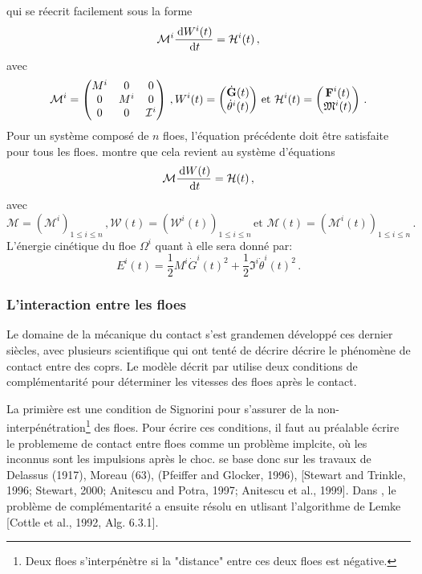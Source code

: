 qui se réecrit facilement sous la forme 
\begin{align}    
    \mathcal{M}^i \frac{\diff W^i(t)}{\diff t} = \mathcal{H}^i(t) \,,
\end{align}
avec 
$$
\mathcal{M}^i = 
\begin{pmatrix}
    M^i & 0 & 0 \\ 0 & M^i & 0 \\ 0 & 0 & \mathcal{I}^i
\end{pmatrix} \,,
W^i(t) = 
\begin{pmatrix}
    \dot{\bm{\mathrm{G}}}(t) \\ \dot{\theta}^i(t)
\end{pmatrix} \,
\text{et } \mathcal{H}^i(t) = 
\begin{pmatrix}
    \bm{\mathrm{F}}^i(t) \\ \mathfrak{M}^i(t)
\end{pmatrix} \,.
$$
Pour un système composé de $n$ floes, l'équation précédente doit être satisfaite pour tous les floes. \cite[p.18]{rabatel2015thesis} montre que cela revient au système d'équations
\begin{align} \label{eq:bilan1}
    \mathcal{M} \frac{\diff W(t)}{\diff t} = \mathcal{H}(t) \,,
\end{align}
avec 
$$
\mathcal{M} = (\mathcal{M}^i)_{1\leq i \leq n } \,,
\mathcal{W}(t) = (\mathcal{W}^i(t))_{1\leq i \leq n } \, \text{et }
\mathcal{M}(t) = (\mathcal{M}^i(t))_{1\leq i \leq n }  \,.
$$
L'énergie cinétique du floe $\Omega^i$ quant à elle sera donné par:
$$
E^i(t) = \frac{1}{2}M^i \dot{G}^i(t)^2 + \frac{1}{2}\mathfrak{I}^i \dot{\theta}^i(t)^2 \,. 
$$ 



\subsubsection{L'interaction entre les floes}

Le domaine de la mécanique du contact s'est grandemen développé ces dernier siècles, avec plusieurs scientifique qui ont tenté de décrire décrire le phénomène de contact entre des coprs. Le modèle décrit par \parencite[p.5892]{rabatel2015dynamics} utilise deux conditions de complémentarité pour déterminer les vitesses des floes après le contact. 

La primière est une condition de Signorini\parencite{signorini1933sopra} pour s'assurer de la non-interpénétration\footnote{Deux floes s'interpénètre si la "distance" entre ces deux floes est négative.} des floes. Pour écrire ces conditions, il faut au préalable écrire le problememe de contact entre floes comme un problème implcite, où les inconnus sont les impulsions après le choc. \citeauthor{rabatel2015thesis} se base donc sur les travaux de Delassus (1917), Moreau (63), (Pfeiffer and Glocker, 1996), [Stewart and Trinkle, 1996; Stewart, 2000; Anitescu and Potra, 1997; Anitescu et al., 1999]. Dans \parencite[p.5892]{rabatel2015dynamics}, le problème de complémentarité a ensuite résolu en utlisant l'algorithme de Lemke [Cottle et al., 1992, Alg. 6.3.1]. 

